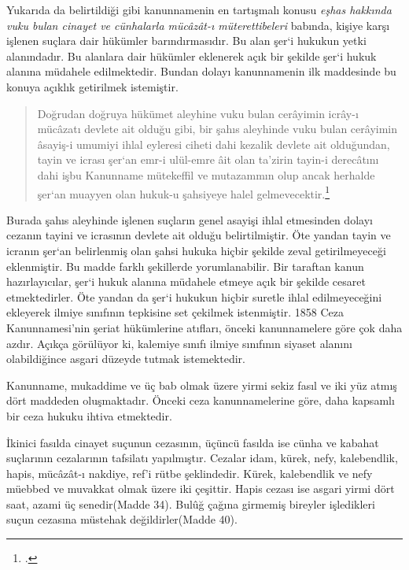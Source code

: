 Yukarıda da belirtildiği gibi kanunnamenin en tartışmalı konusu \textit{eşhas hakkında vuku bulan cinayet ve cünhalarla mücâzât-ı müterettibeleri} babında, kişiye karşı işlenen suçlara dair hükümler barındırmasıdır. 
Bu alan şer`i hukukun yetki alanındadır. Bu alanlara dair hükümler eklenerek açık bir şekilde şer`i hukuk alanına müdahele edilmektedir. Bundan dolayı kanunnamenin ilk maddesinde bu konuya açıklık getirilmek istemiştir.
\begin{quote}
Doğrudan doğruya hükümet aleyhine vuku bulan cerâyimin icrây-ı mücâzatı devlete ait olduğu gibi, bir şahıs aleyhinde vuku bulan cerâyimin âsayiş-i umumiyi ihlal eyleresi ciheti dahi kezalik devlete ait olduğundan, tayin ve icrası şer`an emr-i ulül-emre âit olan ta'zirin tayin-i derecâtını dahi işbu Kanunname mütekeffil ve mutazammın olup ancak herhalde şer`an muayyen olan hukuk-u şahsiyeye halel gelmevecektir.\footcite[834]{islam_osmanli_hukuku}
\end{quote}
Burada şahıs aleyhinde işlenen suçların genel asayişi ihlal etmesinden dolayı cezanın tayini ve icrasının devlete ait olduğu belirtilmiştir. Öte yandan tayin ve icranın şer`an belirlenmiş olan şahsi hukuka hiçbir şekilde zeval getirilmeyeceği eklenmiştir. Bu madde farklı şekillerde 
yorumlanabilir. Bir taraftan kanun hazırlayıcılar, şer`i hukuk alanına müdahele etmeye açık bir şekilde cesaret etmektedirler. Öte yandan da şer`i hukukun hiçbir suretle ihlal edilmeyeceğini ekleyerek ilmiye sınıfının tepkisine set çekilmek istenmiştir. 
1858 Ceza Kanunnamesi'nin şeriat hükümlerine atıfları, önceki kanunnamelere göre çok daha azdır. Açıkça görülüyor ki, kalemiye sınıfı ilmiye sınıfının siyaset alanını olabildiğince asgari düzeyde tutmak istemektedir.

Kanunname, mukaddime ve üç bab olmak üzere yirmi sekiz fasıl ve iki yüz atmış dört maddeden oluşmaktadır. Önceki ceza kanunnamelerine göre, daha kapsamlı bir ceza hukuku ihtiva etmektedir.

İkinici fasılda cinayet suçunun cezasının, üçüncü fasılda ise cünha ve kabahat suçlarının cezalarının tafsilatı yapılmıştır. Cezalar idam, kürek, nefy, kalebendlik, hapis, mücâzât-ı nakdiye, ref'i rütbe şeklindedir.
Kürek, kalebendlik ve nefy müebbed ve muvakkat olmak üzere iki çeşittir. Hapis cezası ise asgari yirmi dört saat, azami üç senedir(Madde 34). Bulûğ çağına girmemiş bireyler işledikleri suçun cezasına müstehak değildirler(Madde 40).

